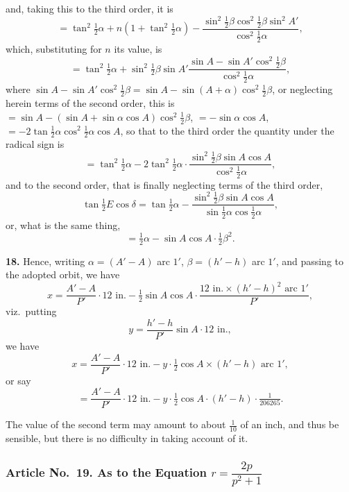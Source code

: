 \documentclass[11pt,a4paper]{article}
\begin{document}
and, taking this to the third order, it is
\[
= \tan^{2}\tfrac{1}{2}\alpha + n(1 + \tan^{2}\tfrac{1}{2}\alpha) - \frac{\sin^{2}\tfrac{1}{2}\beta \cos^{2}\tfrac{1}{2}\beta \sin^{2}A'}{\cos^{2}\tfrac{1}{2}\alpha},
\]
which, substituting for $n$ its value, is
\[
= \tan^{2}\tfrac{1}{2}\alpha + \sin^{2}\tfrac{1}{2}\beta \sin A' \frac{\sin A - \sin A' \cos^{2}\tfrac{1}{2}\beta}{\cos^{2}\tfrac{1}{2}\alpha},
\]
where $\sin A - \sin A' \cos^{2}\tfrac{1}{2}\beta = \sin A - \sin(A + \alpha) \cos^{2}\tfrac{1}{2}\beta$, or neglecting herein terms of the second order, this is $= \sin A - (\sin A + \sin \alpha \cos A) \cos^{2}\tfrac{1}{2}\beta$, $= -\sin \alpha \cos A$, $= -2\tan \tfrac{1}{2}\alpha \cos^{2}\tfrac{1}{2}\alpha \cos A$, so that to the third order the quantity under the radical sign is
\[
= \tan^{2}\tfrac{1}{2}\alpha - 2\tan^{2}\tfrac{1}{2}\alpha \cdot \frac{\sin^{2}\tfrac{1}{2}\beta \sin A \cos A}{\cos^{2}\tfrac{1}{2}\alpha},
\]
and to the second order, that is finally neglecting terms of the third order,
\[
\tan \tfrac{1}{2}E \cos \delta = \tan \tfrac{1}{2}\alpha - \frac{\sin^{2}\tfrac{1}{2}\beta \sin A \cos A}{\sin \tfrac{1}{2}\alpha \cos \tfrac{1}{2}\alpha},
\]
or, what is the same thing,
\[
= \tfrac{1}{2}\alpha - \sin A \cos A \cdot \tfrac{1}{2}\beta^{2}.
\]

\noindent\textbf{18.} Hence, writing $\alpha = (A' - A)$ arc $1'$, $\beta = (h' - h)$ arc $1'$, and passing to the adopted orbit, we have
\[
x = \frac{A' - A}{P'} \cdot 12 \text{ in.} - \tfrac{1}{2}\sin A \cos A \cdot \frac{12 \text{ in.} \times (h' - h)^{2} \text{ arc } 1'}{P'},
\]
viz.\ putting
\[
y = \frac{h' - h}{P'} \sin A \cdot 12 \text{ in.},
\]
we have
\[
x = \frac{A' - A}{P'} \cdot 12 \text{ in.} - y \cdot \tfrac{1}{2}\cos A \times (h' - h) \text{ arc } 1',
\]
or say
\[
= \frac{A' - A}{P'} \cdot 12 \text{ in.} - y \cdot \tfrac{1}{2}\cos A \cdot (h' - h) \cdot \tfrac{1}{206265}.
\]

The value of the second term may amount to about $\tfrac{1}{10}$ of an inch, and thus be sensible, but there is no difficulty in taking account of it.

\subsubsection*{Article No.\ 19. As to the Equation $r = \dfrac{2p}{p^{2}+1}$}
\end{document}
